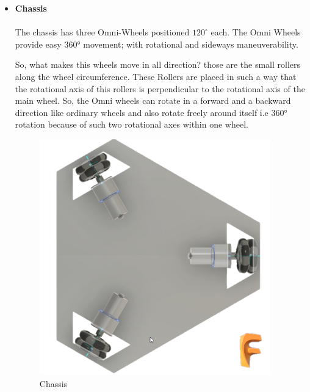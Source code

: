 \begin{itemize}[wide, labelwidth=!, labelindent=0pt]
    \newpage
    
    \item \textbf{Chassis}
    \vspace{-0.5cm}
    \paragraph{} The chassis has three Omni-Wheels positioned $120^{\circ}$ each. The Omni Wheels provide easy 360° movement; with rotational and sideways maneuverability.
    
    So, what makes this wheels move in all direction? those are the small rollers along the wheel circumference. These Rollers are placed in such a way that the rotational axis of this rollers is perpendicular to the rotational axis of the main wheel. So, the Omni wheels can rotate in a forward and a backward direction like ordinary wheels and also rotate freely around itself i.e 360° rotation because of such two rotational axes within one wheel.

    \begin{figure}[H]
    \centering
    \includegraphics[width = 10cm]{project/images/chassis_3d_model.png}
    \caption{Chassis}
    \end{figure}

\end{itemize}